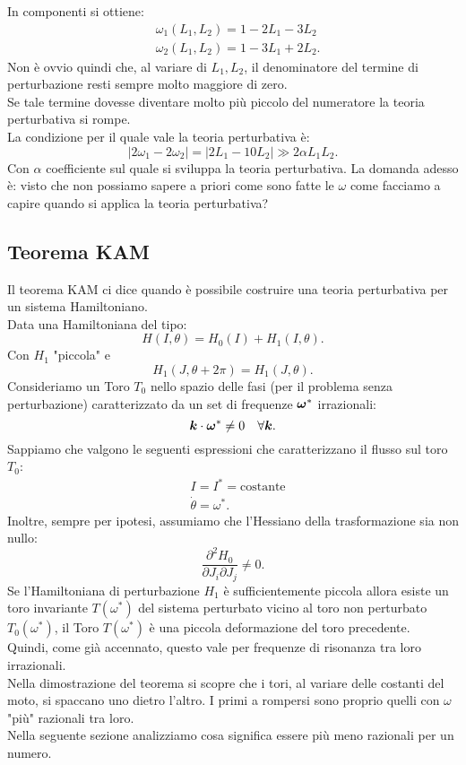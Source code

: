 In componenti si ottiene:
\[\begin{aligned}
    & \omega_1( L_1,L_2) = 1-2L_1-3L_2\\
    & \omega_2(L_1,L_2) = 1-3L_1+2L_2
.\end{aligned}\]
Non è ovvio quindi che, al variare di $L_1,L_2$, il denominatore del termine di perturbazione resti sempre molto maggiore di zero.\\
Se tale termine dovesse diventare molto più piccolo del numeratore la teoria perturbativa si rompe. \\
La condizione per il quale vale la teoria perturbativa è:
\[
    \left|2\omega_1-2\omega_2\right| = \left|2L_1-10L_2\right|\gg 2\alpha L_1L_2
.\] 
Con $\alpha$ coefficiente sul quale si sviluppa la teoria perturbativa. La domanda adesso è: visto che non possiamo sapere a priori come sono fatte le $\omega$ come facciamo a capire quando si applica la teoria perturbativa?
\subsection{Teorema KAM}%
\label{sub:Teorema KAM}
Il teorema KAM ci dice quando è possibile costruire una teoria perturbativa per un sistema Hamiltoniano.\\
Data una Hamiltoniana del tipo:
\[
    H(I,\theta)= H_0(I)+H_1(I,\theta)
.\] 
Con $H_1$ "piccola" e 
\[
    H_1(J,\theta +2\pi) = H_1(J,\theta)
.\] 
Consideriamo un Toro $T_0$ nello spazio delle fasi (per il problema senza perturbazione) caratterizzato da un set di frequenze $\boldsymbol{\omega}^*$ irrazionali:
\[
    \boldsymbol{k}\cdot \boldsymbol{\omega}^* \neq 0 \quad \forall \boldsymbol{k}
.\] 
Sappiamo che valgono le seguenti espressioni che caratterizzano il flusso sul toro $T_0$:
\[\begin{aligned}
    & I = I^* = \text{costante}\\
    & \dot{\theta} = \omega^*
.\end{aligned}\]
Inoltre, sempre per ipotesi, assumiamo che l'Hessiano della trasformazione sia non nullo:
\[
    \frac{\partial ^2 H_0}{\partial J_i \partial J_j} \neq 0
.\] 
Se l'Hamiltoniana di perturbazione $H_1$ è sufficientemente piccola allora esiste un toro invariante $T(\omega^*)$ del sistema perturbato vicino al toro non perturbato $T_0(\omega^*)$, il Toro $T(\omega^*)$ è una piccola deformazione del toro precedente.\\
Quindi, come già accennato, questo vale per frequenze di risonanza tra loro irrazionali.\\
Nella dimostrazione del teorema si scopre che i tori, al variare delle costanti del moto, si spaccano uno dietro l'altro. I primi a rompersi sono proprio quelli con $\omega$ "più" razionali tra loro. \\
Nella seguente sezione analizziamo cosa significa essere più meno razionali per un numero.
